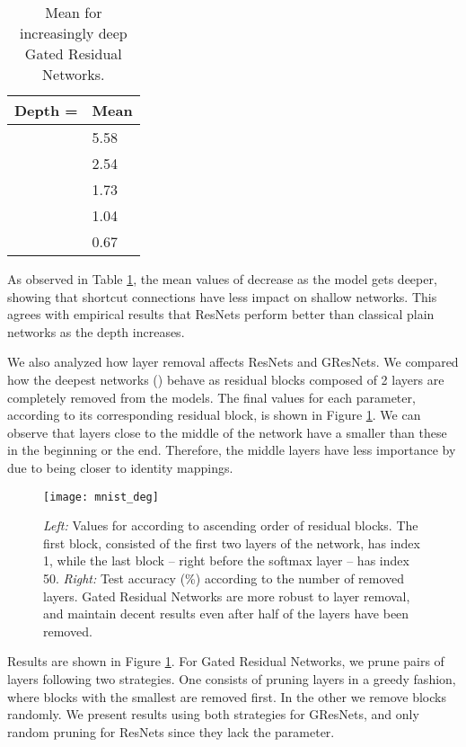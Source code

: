 \documentclass{article} \RequirePackage{amsmath,amsthm,amsfonts,amssymb}
\begin{document}
\begin{table}[h!]
\centering
    \begin{tabular}{ | l | l |}
    \hline
    Depth =  & Mean  \\ \hline
     & 			5.58 	\\ \hline
     & 			2.54	\\ \hline
     & 			1.73	\\ \hline
     & 			1.04 	\\ \hline
     & 			0.67 	\\ \hline
    \end{tabular}
\caption{Mean  for increasingly deep Gated Residual Networks.}
    \label{mnist_k}   
\end{table}

As observed in Table \ref{mnist_k}, the mean values of  decrease as the model gets deeper, showing that shortcut connections have less impact on shallow networks. This agrees with empirical results that ResNets perform better than classical plain networks as the depth increases.



We also analyzed how layer removal affects ResNets and GResNets. We compared how the deepest networks () behave as residual blocks composed of 2 layers are completely removed from the models. The final values for each  parameter, according to its corresponding residual block, is shown in Figure \ref{pruning}. We can observe that layers close to the middle of the network have a smaller  than these in the beginning or the end. Therefore, the middle layers have less importance by due to being closer to identity mappings.


\begin{figure}[!ht]
  \centering
    \texttt{[image: mnist\_deg]}
  \caption{\textit{Left: } Values for  according to ascending order of residual blocks. The first block, consisted of the first two layers of the network, has index 1, while the last block -- right before the softmax layer -- has index 50. \textit{Right:} Test accuracy (\%) according to the number of removed layers. Gated Residual Networks are more robust to layer removal, and maintain decent results even after half of the layers have been removed. }
\label{pruning}
\end{figure}

Results are shown in Figure \ref{pruning}. For Gated Residual Networks, we prune pairs of layers following two strategies. One consists of pruning layers in a greedy fashion, where blocks with the smallest  are removed first. In the other we remove blocks randomly. We present results using both strategies for GResNets, and only random pruning for ResNets since they lack the  parameter.
\end{document}
